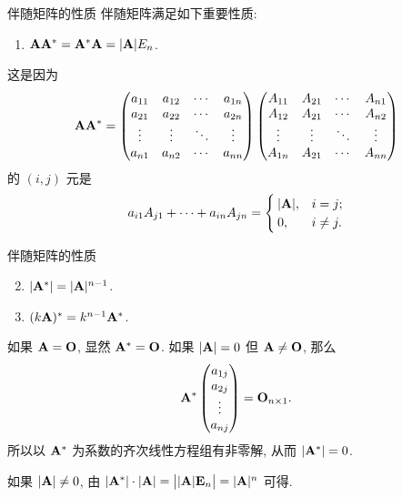 \begin{frame}{伴随矩阵的性质}
	\onslide<+->
	伴随矩阵满足如下重要性质:
	\begin{alertblock@}
		\begin{enumerate}
		\item ${\mathbf{A}}{\mathbf{A}}^*={\mathbf{A}}^*{\mathbf{A}}=|{\mathbf{A}}|E_n$.
		\end{enumerate}
	\end{alertblock@}
	\onslide<+->
	这是因为
	\[{\mathbf{A}}{\mathbf{A}}^*=\begin{pmatrix}
		a_{11}&a_{12}&\cdots &a_{1n}\\
		a_{21}&a_{22}&\cdots &a_{2n}\\
		\vdots&\vdots&\ddots&\vdots\\
		a_{n1}&a_{n2}&\cdots &a_{nn}
	\end{pmatrix}\begin{pmatrix}
		A_{11}&A_{21}&\cdots&A_{n1}\\
		A_{12}&A_{21}&\cdots&A_{n2}\\
		\vdots&\vdots&\ddots&\vdots\\
		A_{1n}&A_{21}&\cdots&A_{nn}
	\end{pmatrix}\]
	的 $(i,j)$ 元是
	\[a_{i1}A_{j1}+\cdots+a_{in}A_{jn}=\begin{cases}
		|{\mathbf{A}}|,&i=j;\\
		0,&i\neq j.
	\end{cases}\]
\end{frame}



\begin{frame}{伴随矩阵的性质}
	\onslide<+->
	\begin{block@}
		\begin{enumerate}
			\setcounter{enumi}{1}
			\item $|{\mathbf{A}}^*|=|{\mathbf{A}}|^{n-1}$.
			\item $(k{\mathbf{A}})^*=k^{n-1}{\mathbf{A}}^*$.
		\end{enumerate}
	\end{block@}
	\onslide<+->
	如果 ${\mathbf{A}}={\mathbf{O}}$, 显然 ${\mathbf{A}}^*={\mathbf{O}}$.
	\onslide<+->
	如果 $|{\mathbf{A}}|=0$ 但 ${\mathbf{A}}\neq {\mathbf{O}}$, 那么
	\[{\mathbf{A}}^*\begin{pmatrix}
		a_{1j}\\a_{2j}\\\vdots\\a_{nj}
	\end{pmatrix}={\mathbf{O}}_{n\times 1}.\]
	\onslide<+->
	所以以 ${\mathbf{A}}^*$ 为系数的齐次线性方程组有非零解, 从而 $|{\mathbf{A}}^*|=0$.

	\onslide<+->
	如果 $|{\mathbf{A}}|\neq0$, 由 $|{\mathbf{A}}^*|\cdot|{\mathbf{A}}|=\bigl||{\mathbf{A}}|{\mathbf{E}}_n\bigr|=|{\mathbf{A}}|^n$ 可得.
\end{frame}

